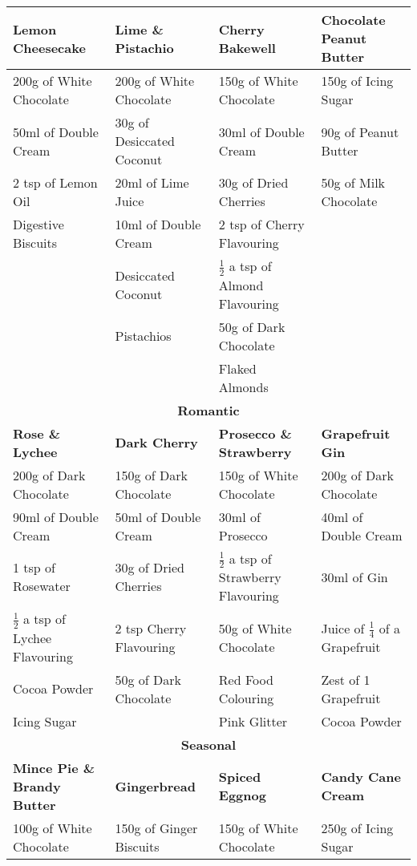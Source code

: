 \documentclass[11pt, english]{article}
\begin{document}
\begin{center}
\begin{longtable}{p{3.75cm}p{3.75cm}p{3.75cm}p{3.75cm}}
	        \hline
	        \hline
	        \textbf{Lemon Cheesecake} & \textbf{Lime \& Pistachio} & \textbf{Cherry Bakewell} & \textbf{Chocolate Peanut Butter}\\
	        \hline
	        200g of White Chocolate & 200g of White Chocolate & 150g of White Chocolate & 150g of Icing Sugar\\
	        50ml of Double Cream & 30g of Desiccated Coconut & 30ml of Double Cream & 90g of Peanut Butter\\
	        2 tsp of Lemon Oil & 20ml of Lime Juice & 30g of Dried Cherries & 50g of Milk Chocolate\\
	        Digestive Biscuits & 10ml of Double Cream & 2 tsp of Cherry Flavouring & \\
	        & Desiccated Coconut & $\frac{1}{2}$ a tsp of Almond Flavouring & \\
	        & Pistachios & 50g of Dark Chocolate & \\
	        & & Flaked Almonds & \\
	        \hline
	        \hline
	        \multicolumn{4}{c}{\textbf{Romantic}}\\
	        \hline
	        \hline
	        \textbf{Rose \& Lychee} & \textbf{Dark Cherry} & \textbf{Prosecco \& Strawberry} & \textbf{Grapefruit Gin}\\
	        \hline
	        200g of Dark Chocolate & 150g of Dark Chocolate & 150g of White Chocolate & 200g of Dark Chocolate\\
	        90ml of Double Cream & 50ml of Double Cream & 30ml of Prosecco & 40ml of Double Cream\\
	        1 tsp of Rosewater & 30g of Dried Cherries & $\frac{1}{2}$ a tsp of Strawberry Flavouring & 30ml of Gin\\
	        $\frac{1}{2}$ a tsp of Lychee Flavouring & 2 tsp Cherry Flavouring & 50g of White Chocolate & Juice of $\frac{1}{4}$ of a Grapefruit\\
	        Cocoa Powder & 50g of Dark Chocolate & Red Food Colouring & Zest of 1 Grapefruit\\
	        Icing Sugar & & Pink Glitter & Cocoa Powder\\
	        \hline
	        \hline
		\multicolumn{4}{c}{\textbf{Seasonal}}\\
	        \hline
	        \hline
		\textbf{Mince Pie \& Brandy Butter} & \textbf{Gingerbread} & \textbf{Spiced Eggnog} & \textbf{Candy Cane Cream}\\
        	\hline
        	100g of White Chocolate & 150g of Ginger Biscuits & 150g of White Chocolate & 250g of Icing Sugar\\

\end{longtable}
\end{center}
\end{document}
